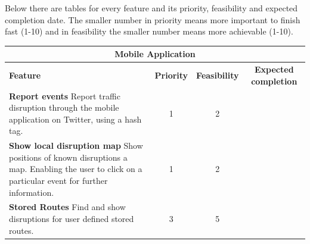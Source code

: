 Below there are tables for every feature and its priority, feasibility and expected completion date. The smaller number in priority means more important to finish fast (1-10) and in feasibility the smaller number means more achievable (1-10).

\begin{center}
\begin{tabular}{ | p{6cm} | c | c | c | }
\hline
\multicolumn{4}{|c|}{\textbf{Mobile Application}} \\ \hline
\textbf{Feature} & \textbf{Priority} & \textbf{Feasibility} & \textbf{Expected completion} \\ \hline
\textbf{Report events}\newline
Report traffic disruption through the mobile application on Twitter, using a hash tag. & 1 & 2 & \\ \hline
\textbf{Show local disruption map}\newline
Show positions of known disruptions a map. Enabling the user to click on a particular event for further information. & 1 & 2 & \\ \hline
\textbf{Stored Routes}\newline
Find and show disruptions for user defined stored routes. & 3 & 5 & \\ \hline
\end{tabular}
\end{center}

